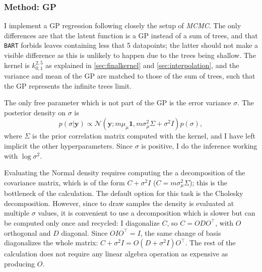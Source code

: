 \documentclass[a4paper]{article}
\theoremstyle{definition}
\let\oldmarginpar\marginpar
\renewcommand{\marginpar}[1]{\oldmarginpar{\sffamily\scriptsize #1}}
\renewcommand{\marginpar}[1]{\relax} %
\begin{document}
    \subsubsection{Method: GP}
    \label{sec:modelgp}

    I implement a GP regression following closely the setup of \emph{MCMC}. The only differences are that the latent function is a GP instead of a sum of trees, and that \texttt{BART} forbids leaves containing less that 5 datapoints; the latter should not make a visible difference as this is unlikely to happen due to the trees being shallow.\marginpar{Unless the predictors are correlated! Could I make a fork of BART and put that limit in a config? It should be easy to do, I can fork bnptools and use install\_github on my fork.} The kernel is $k^{2,5}_{0,1}$ as explained in \autoref{sec:finalkernel} and \autoref{sec:interpolation}, and the variance and mean of the GP are matched to those of the sum of trees, such that the GP represents the infinite trees limit.

    The only free parameter which is not part of the GP is the error variance $\sigma$. The posterior density on $\sigma$ is
    \begin{equation}
        p(\sigma|\mathbf y) \propto \mathcal N(\mathbf y; m\mu_\mu\mathbf 1, m\sigma_\mu^2\Sigma + \sigma^2I) p(\sigma),
    \end{equation}
    where $\Sigma$ is the prior correlation matrix computed with the kernel, and I have left implicit the other hyperparameters. Since $\sigma$ is positive, I do the inference working with $\log\sigma^2$.

    Evaluating the Normal density requires computing the a decomposition of the covariance matrix, which is of the form $C+\sigma^2I$ ($C=m\sigma_\mu^2\Sigma$); this is the bottleneck of the calculation. The default option for this task is the Cholesky decomposition. However, since to draw samples the density is evaluated at multiple $\sigma$ values, it is convenient to use a decomposition which is slower but can be computed only once and recycled: I diagonalize $C$, so $C = ODO^\top$, with $O$ orthogonal and $D$ diagonal. Since $OIO^\top = I$, the same change of basis diagonalizes the whole matrix: $C + \sigma^2I = O(D + \sigma^2I)O^\top$. The rest of the calculation does not require any linear algebra operation as expensive as producing $O$.
\end{document}
